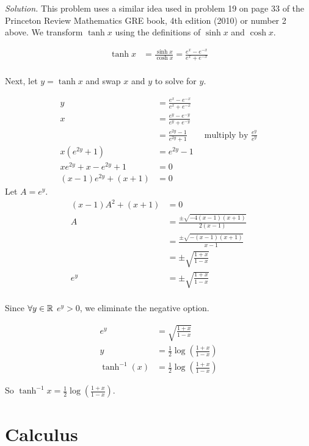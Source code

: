 \textit{Solution.} This problem uses a similar idea used in problem 19 on page 33 of the Princeton Review Mathematics GRE book, 4th edition (2010) or number 2 above. We transform $\tanh x$ using the definitions of $\sinh x$ and $\cosh x$.

\begin{align*}
\tanh x & = \frac{\sinh x}{\cosh x} = \frac{e^x - e^{-x}}{e^x + e^{-x}} \\
\end{align*}

Next, let $y = \tanh x$ and swap $x$ and $y$ to solve for $y$.

\begin{align*}
y & = \frac{e^x - e^{-x}}{e^x + e^{-x}} \\
x & = \frac{e^y - e^{-y}}{e^y + e^{-y}} \\
  & = \frac{e^{2y} - 1}{e^{2y} + 1} \qquad \textrm{multiply by } \frac{e^y}{e^y} \\
x(e^{2y} + 1) & = e^{2y} - 1 \\
xe^{2y} + x - e^{2y} + 1 & = 0 \\
(x - 1)e^{2y} + (x + 1) & = 0
\end{align*}
Let $A = e^y$.
\begin{align*}
(x - 1)A^2 + (x + 1) & = 0 \\
A & = \frac{\pm \sqrt{-4(x - 1)(x + 1)}}{2(x - 1)} \\
  & = \frac{\pm \sqrt{-(x - 1)(x + 1)}}{x - 1} \\
  & = \pm \sqrt{\frac{1 + x}{1 - x}} \\
e^y & = \pm \sqrt{\frac{1 + x}{1 - x}} \\
\end{align*}

Since $\forall y \in \mathbb{R}$ $e^y > 0$, we eliminate the negative option.

\begin{align*}
e^y & = \sqrt{\frac{1 + x}{1 - x}} \\
y & = \frac12 \log\left(\frac{1 + x}{1 - x}\right) \\
\tanh^{-1}(x) & = \frac12 \log\left(\frac{1 + x}{1 - x}\right)
\end{align*}

So $\tanh^{-1}x = \displaystyle\frac12 \log\left(\frac{1 + x}{1 - x}\right)$. \\
\section{Calculus}
